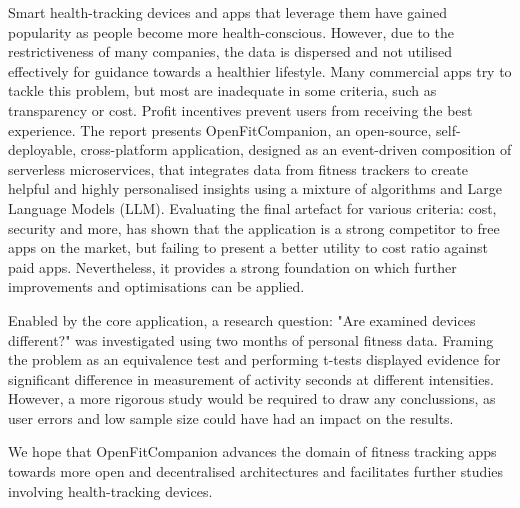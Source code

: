 %
{\singlespacing
Smart health-tracking devices and apps that leverage them have gained popularity as people become more health-conscious. However, due to the restrictiveness of many companies, the data is dispersed and not utilised effectively for guidance towards a healthier lifestyle. Many commercial apps try to tackle this problem, but most are inadequate in some criteria, such as transparency or cost. Profit incentives prevent users from receiving the best experience. The report presents OpenFitCompanion, an open-source, self-deployable, cross-platform application, designed as an event-driven composition of serverless microservices, that integrates data from fitness trackers to create helpful and highly personalised insights using a mixture of algorithms and Large Language Models (LLM).  Evaluating the final artefact for various criteria: cost, security and more, has shown that the application is a strong competitor to free apps on the market, but failing to present a better utility to cost ratio against paid apps. Nevertheless, it provides a strong foundation on which further improvements and optimisations can be applied.

Enabled by the core application, a research question: "Are examined devices different?" was investigated using two months of personal fitness data. Framing  the problem as an equivalence test and performing t-tests displayed evidence for significant difference in measurement of activity seconds at different intensities. However, a more rigorous study would be required to draw any conclussions, as user errors and low sample size could have had an impact on the results. 

We hope that OpenFitCompanion advances the domain of fitness tracking apps towards more open and decentralised architectures and facilitates further studies involving health-tracking devices. 
}

